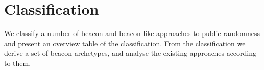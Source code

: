 \section{Classification}\label{sec:classification}

We classify a number of beacon and beacon-like approaches to public randomness and present an overview table of the classification.
From the classification we derive a set of beacon archetypes, and analyse the existing approaches according to them.
